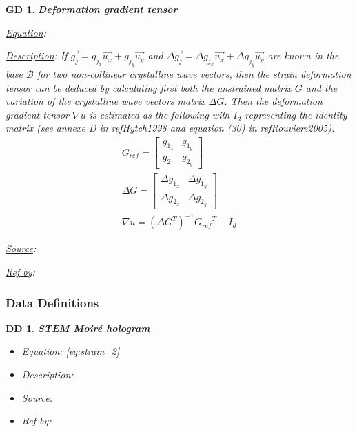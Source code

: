 \documentclass[12pt]{article}
\newtheorem{DD}{DD}
\newtheorem{GD}{GD}
\begin{document}
\begin{GD}
\normalfont \textbf{Deformation gradient tensor}
\item \underline{Equation}: 
\item \underline{Description}: If $\vec{g_j}=g_{j_{x}}\vec{u_{x}}+g_{j_{y}}\vec{u_{y}}$ and $\Delta \vec{g_{j}}=\Delta g_{j_{x}}\vec{u_{x}}+\Delta g_{j_{y}}\vec{u_{y}}$ are known in the base $\mathcal{B}$ for two non-collinear crystalline wave vectors, then the strain deformation tensor can be deduced by calculating first both the unstrained matrix $G$ and the variation of the crystalline wave vectors matrix $\Delta G$. Then the deformation gradient tensor $\nabla u$ is estimated as the following with $I_{d}$ representing the identity matrix (see annexe D in ref{Hytch1998} and equation (30) in ref{Rouviere2005}). 
\begin{equation}
\begin{gathered}
	G_{ref} =
	\begin{bmatrix}
	g_{1_{x}} & g_{1_{y}} \\
	g_{2_{x}} & g_{2_{y}} 
	\end{bmatrix} \\
	\Delta G =
	\begin{bmatrix}
	\Delta g_{1_{x}} & \Delta g_{1_{y}} \\
	\Delta g_{2_{x}} & \Delta g_{2_{y}} 
	\end{bmatrix} \\
\nabla u = ({\Delta G}^{T})^{-1}{G_{ref}}^{T}-I_{d}
\end{gathered}
\label{eq:strain_1}
\end{equation}
\item \underline{Source}:
\item \underline{Ref by}:
\label{GD_3}
\end{GD}

\subsubsection{Data Definitions}\label{sec_datadef}

\begin{DD}
\normalfont \textbf{STEM Moir{\'e} hologram}
\begin{itemize}
\item Equation: \cref{eq:strain_2}
\item Description:
\item Source:
\item Ref by:
\end{itemize}
\label{DD_1}
\end{DD}
\end{document}
